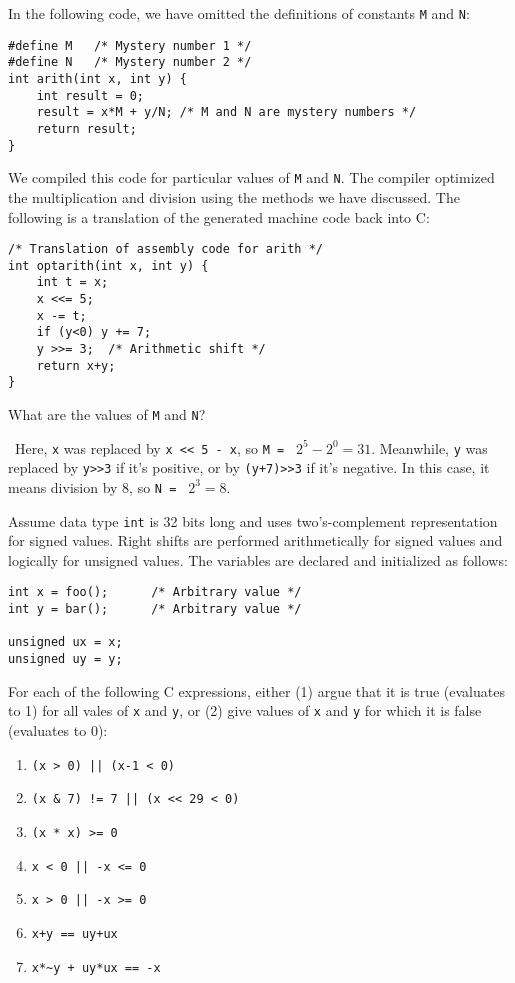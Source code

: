 \documentclass[12pt]{article}
\newenvironment{ex}[2][Exercise]{\begin{trivlist}
		\item[\hskip \labelsep {\bfseries #1}\hskip \labelsep {\bfseries #2.}]}{\end{trivlist}}
\newenvironment{sol}[1][Solution]{\begin{trivlist}
		\item[\hskip \labelsep {\bfseries #1:}]}{\end{trivlist}}
\begin{document}
\begin{ex}{2.43}
	In the following code, we have omitted the definitions of constants \texttt{M} and \texttt{N}:
	\begin{lstlisting}
#define M	/* Mystery number 1 */
#define N	/* Mystery number 2 */
int arith(int x, int y) {
	int result = 0;
	result = x*M + y/N;	/* M and N are mystery numbers */
	return result;
}
	\end{lstlisting}
	We compiled this code for particular values of \texttt{M} and \texttt{N}. The compiler
	optimized the multiplication and division using the methods we have discussed. The
	following is a translation of the generated machine code back into C:
	
	\begin{lstlisting}
/* Translation of assembly code for arith */
int optarith(int x, int y) {
	int t = x;
	x <<= 5;
	x -= t;
	if (y<0) y += 7;
	y >>= 3;  /* Arithmetic shift */
	return x+y;
}
	\end{lstlisting}
	What are the values of \texttt{M} and \texttt{N}?
\end{ex}

\begin{sol}
	\
	Here, \texttt{x} was replaced by \texttt{x << 5 - x}, so \texttt{M = } $2^5-2^0=31$.
	Meanwhile, \texttt{y} was replaced by \texttt{y>>3} if it's positive, or by
	\texttt{(y+7)>>3} if it's negative. In this case, it means division by 8, so
	\texttt{N = } $2^3=8$.
\end{sol}

\begin{ex}{2.44}
	Assume data type \texttt{int} is 32 bits long and uses two's-complement representation
	for signed values. Right shifts are performed arithmetically for signed values and
	logically for unsigned values. The variables are declared and initialized as follows:
	\begin{lstlisting}
int x = foo();		/* Arbitrary value */
int y = bar();		/* Arbitrary value */

unsigned ux = x;
unsigned uy = y;
	\end{lstlisting}
	For each of the following C expressions, either (1) argue that it is true (evaluates to 1)
	for all vales of \texttt{x} and \texttt{y}, or (2) give values of \texttt{x} and \texttt{y}
	for which it is false (evaluates to 0):
	\begin{enumerate}[label=(\alph*)]
		\item \texttt{(x > 0) || (x-1 < 0)}
		\item \texttt{(x \& 7) != 7 || (x << 29 < 0)}
		\item \texttt{(x * x) >= 0}
		\item \texttt{x < 0 || -x <= 0}
		\item \texttt{x > 0 || -x >= 0}
		\item \texttt{x+y == uy+ux}
		\item \texttt{x*\~{}y + uy*ux == -x}
	\end{enumerate}
\end{ex}
\end{document}
